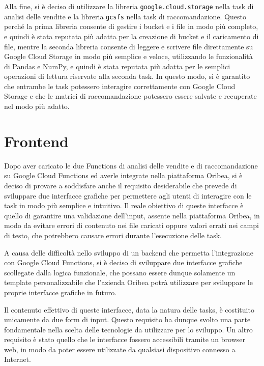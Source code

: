 Alla fine, si è deciso di utilizzare la libreria \texttt{google.cloud.storage} nella task di analisi delle vendite e la libreria \texttt{gcsfs} nella task di raccomandazione.
Questo perché la prima libreria consente di gestire i bucket e i file in modo più completo, e quindi è stata reputata più adatta per la creazione di bucket e il caricamento di file, mentre la seconda libreria consente di leggere e scrivere file direttamente su Google Cloud Storage in modo più semplice e veloce, utilizzando le funzionalità di Pandas e NumPy, e quindi è stata reputata più adatta per le semplici operazioni di lettura riservate alla seconda task.
In questo modo, si è garantito che entrambe le task potessero interagire correttamente con Google Cloud Storage e che le matrici di raccomandazione potessero essere salvate e recuperate nel modo più adatto.


\section{Frontend}
\label{sec:frontend}

Dopo aver caricato le due Functions di analisi delle vendite e di raccomandazione su Google Cloud Functions ed averle integrate nella piattaforma Oribea, si è deciso di provare a soddisfare anche il requisito desiderabile che prevede di sviluppare due interfacce grafiche per permettere agli utenti di interagire con le task in modo più semplice e intuitivo. Il reale obiettivo di queste interfacce è quello di garantire una validazione dell'input, assente nella piattaforma Oribea, in modo da evitare errori di contenuto nei file caricati oppure valori errati nei campi di testo, che potrebbero causare errori durante l'esecuzione delle task.

A causa delle difficoltà nello sviluppo di un backend che permetta l'integrazione con Google Cloud Functions, si è deciso di sviluppare due interfacce grafiche scollegate dalla logica funzionale, che possano essere dunque solamente un template personalizzabile che l'azienda Oribea potrà utilizzare per sviluppare le proprie interfacce grafiche in futuro.

Il contenuto effettivo di queste interfacce, data la natura delle tasks, è costituito unicamente da due form di input. Questo requisito ha dunque svolto una parte fondamentale nella scelta delle tecnologie da utilizzare per lo sviluppo.
Un altro requisito è stato quello che le interfacce fossero accessibili tramite un browser web, in modo da poter essere utilizzate da qualsiasi dispositivo connesso a Internet.

